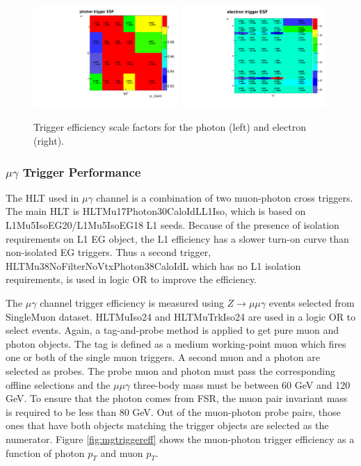 \documentclass[thesis.tex]{subfiles}
\renewcommand\_{\textunderscore\allowbreak}
\begin{document}
\begin{figure}[h]
  \centering
  \includegraphics[width=0.49\textwidth]{Figures/egTrigger_LeadingESF.pdf}
  \includegraphics[width=0.49\textwidth]{Figures/egTrigger_TrailingESF.pdf}
 \caption{Trigger efficiency scale factors for the photon (left) and electron (right). }
  \label{fig:egtriggerESF}
\end{figure}


\subsubsection{$\mu\gamma$ Trigger Performance}

The HLT used in $\mu\gamma$ channel is a combination of two muon-photon cross triggers.
The main HLT is HLT\_Mu17\_Photon30\_CaloIdL\_L1Iso, which is based on L1\_Mu5\_IsoEG20/L1\_Mu5\_IsoEG18 L1 seeds. 
Because of the presence of isolation requirements on L1 EG object, the L1 efficiency has a slower turn-on curve than non-isolated EG triggers.
Thus a second trigger, HLT\_Mu38NoFilterNoVtx\_Photon38\_CaloIdL which has no L1 isolation requirements, is used in logic OR to improve the efficiency.

The $\mu\gamma$ channel trigger efficiency is measured using $Z\rightarrow\mu\mu\gamma$ events selected from SingleMuon dataset. 
HLT\_MuIso24 and HLT\_MuTrkIso24 are used in a logic OR to select events. 
Again, a tag-and-probe method is applied to get pure muon and photon objects. 
The tag is defined as a medium working-point muon which fires one or both of the single muon triggers.
 A second muon and a photon are selected as probes. 
 The probe muon and photon must pass the corresponding offline selections and the $\mu\mu\gamma$ three-body mass must be between 60 GeV and 120 GeV. 
 To ensure that the photon comes from FSR, the muon pair invariant mass is required to be less than 80 GeV. 
 Out of the muon-photon probe pairs, those ones that have both objects matching the trigger objects are selected as the numerator. 
 Figure \ref{fig:mgtriggereff} shows the muon-photon trigger efficiency as a function of photon $p_{T}$ and muon $p_{T}$. 
\end{document}
